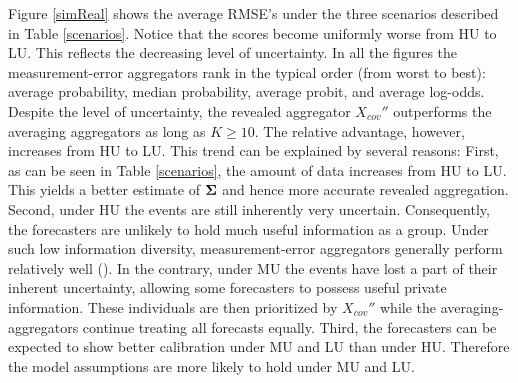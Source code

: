 \documentclass[11pt]{article}
\theoremstyle{definition}
\theoremstyle{definition}
\def\bSigma{{\bf \Sigma}}
\begin{document}
Figure \ref{simReal} shows the average RMSE's under the three scenarios described in Table \ref{scenarios}. Notice that the scores become uniformly worse from HU to LU. This reflects the decreasing level of uncertainty. 
In all the figures the measurement-error aggregators rank in the typical order (from worst to best): average probability, median probability, average probit, and average log-odds. Despite the level of uncertainty, the revealed aggregator $X_{cov}''$ outperforms the averaging aggregators as long as $K \geq 10$. 
The relative advantage, however, increases from HU to LU. This trend can be explained by several reasons: First, as can be seen in Table \ref{scenarios}, the amount of data increases from HU to LU. This yields a better estimate of $\bSigma$ and hence more accurate revealed aggregation. Second, under HU the events are still inherently very uncertain. Consequently, the forecasters are unlikely to hold much useful information as a group. Under such low information diversity, measurement-error aggregators generally perform relatively well (\citealt{satopaamodeling}).  In the contrary, under MU  the events have lost a part of their inherent uncertainty, allowing some forecasters to possess useful private information. These individuals are then prioritized by $X_{cov}''$ while the averaging-aggregators continue treating all forecasts equally. Third, the forecasters can be expected to show better calibration under MU and LU than under HU. Therefore the model assumptions are more likely to hold under MU and LU. 



\end{document}
